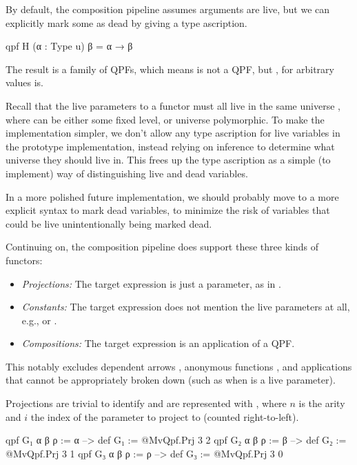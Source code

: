 By default, the composition pipeline assumes arguments are live, but we can explicitly mark some as dead
by giving a type ascription. 
\begin{leancode}
  qpf H (α : Type u) β = α → β 
\end{leancode}
The result is a family of QPFs, which means  is not a QPF, but , for arbitrary values  is.

\begin{remark}
  Recall that the live parameters to a functor must all live in the same universe , where
   can be either some fixed level, or universe polymorphic.
  To make the implementation simpler, we don't allow any type ascription for live variables in the 
  prototype implementation, instead relying on inference to determine what universe they should live in.
  This frees up the type ascription as a simple (to implement) way of distinguishing live and dead
  variables.

  In a more polished future implementation, we should probably move to a more explicit syntax to mark
  dead variables, to minimize the risk of variables that could be live unintentionally being marked dead.
\end{remark}



Continuing on, the composition pipeline does support these three kinds of functors:
\begin{itemize}
    \item \emph{Projections: } The target expression is just a parameter, as in .
    \item \emph{Constants: } The target expression does not mention the live parameters at all, e.g.,  or 
                .
    \item \emph{Compositions: } The target expression is an application of a QPF.\@
\end{itemize}

This notably excludes dependent arrows , anonymous functions ,
and applications that cannot be appropriately broken down (such as  when  is a live parameter).



Projections are trivial to identify and are represented with , 
where $n$ is the arity and $i$ the index of the parameter to project to (counted right-to-left).
\begin{leancode}
  qpf G₁ α β ρ := α  --> def G₁ := @MvQpf.Prj 3 2
  qpf G₂ α β ρ := β  --> def G₂ := @MvQpf.Prj 3 1
  qpf G₃ α β ρ := ρ  --> def G₃ := @MvQpf.Prj 3 0
\end{leancode}


